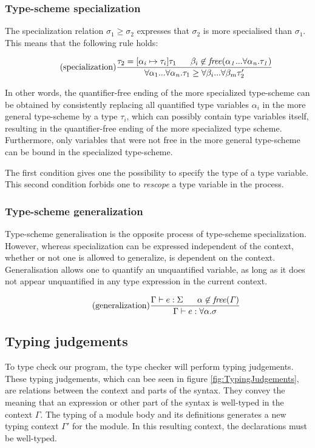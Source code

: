 \documentclass[10pt,a4paper,draft]{article}
\begin{document}
\begin{flushleft}
\subsubsection{Type-scheme specialization}
The specialization relation $\sigma_{1} \geq \sigma_{2}$ expresses that $\sigma_{2}$ is more specialised than $\sigma_{1}$. This means that the following rule holds:
%

\[
\tag{specialization}
\frac{\tau_{2}=[\alpha_{i} \mapsto \tau_{i}]\tau_{1} \;\;\;\;\;\; \beta_{i} \not\in\mathit{free(\alpha_{1}...\forall \alpha_{n}.\tau_{1})}}
{\forall\alpha_{1}...\forall\alpha_{n}.\tau_{1}\geq \forall \beta_{i}...\forall \beta_{m}\tau_{2}'}
\]

In other words, the quantifier-free ending of the more specialized type-scheme can be obtained by consistently replacing all quantified type variables $\alpha_{i}$ in the more general type-scheme by a type $\tau_{i}$, which can possibly contain type variables itself, resulting in the quantifier-free ending of the more specialized type scheme. Furthermore, only variables that were not free in the more general type-scheme can be bound in the specialized type-scheme.

The first condition gives one the possibility to specify the type of a type variable. This second condition forbids one to \emph{rescope} a type variable in the process.

\subsubsection{Type-scheme generalization}
Type-scheme generalisation is the opposite process of type-scheme specialization. However, whereas specialization can be expressed independent of the context, whether or not one is allowed to generalize, is dependent on the context. Generalisation allows one to quantify an unquantified variable, as long as it does not appear unquantified in any type expression in the current context.

\[
\tag{generalization}
\frac{\Gamma \vdash e:\Sigma \;\;\;\;\;\; \alpha \not\in \mathit{free(\Gamma)}}{\Gamma \vdash e : \forall \alpha . \sigma}
\]


\subsection{Typing judgements}
To type check our program, the type checker will perform typing judgements. These typing judgements, which can bee seen in figure \ref{fig:TypingJudgements}, are relations between the context and parts of the syntax. They convey the meaning that an expression or other part of the syntax is well-typed in the context $\Gamma$. The typing of a module body and its definitions generates a new typing context $\Gamma'$ for the module. In this resulting context, the declarations must be well-typed.


\end{flushleft}
\end{document}
